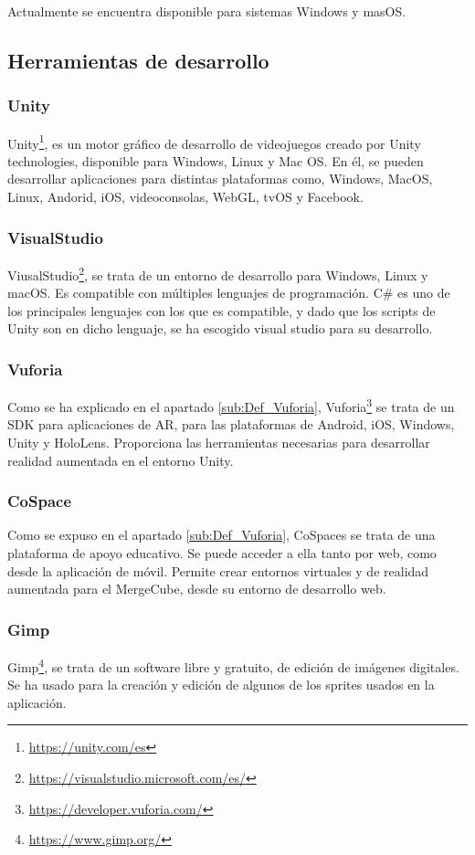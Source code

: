  
 Actualmente se encuentra disponible para sistemas Windows y masOS.

\subsection{Herramientas de desarrollo}

\subsubsection{Unity}
Unity\footnote{\url{https://unity.com/es}}, es un motor gráfico de desarrollo de videojuegos creado por Unity technologies, disponible para Windows, Linux y Mac OS. En él, se pueden desarrollar aplicaciones para distintas plataformas como, Windows, MacOS, Linux, Andorid, iOS, videoconsolas, WebGL, tvOS y Facebook.

\subsubsection{VisualStudio}
ViusalStudio\footnote{\url{https://visualstudio.microsoft.com/es/}}, se trata de un entorno de desarrollo para Windows, Linux y macOS. Es compatible con múltiples lenguajes de programación. C\# es uno de los principales lenguajes con los que es compatible, y dado que los scripts de Unity son en dicho lenguaje, se ha escogido visual studio para su desarrollo.


\subsubsection{Vuforia}
Como se ha explicado en el apartado \ref{sub:Def_Vuforia}, Vuforia\footnote{\url{https://developer.vuforia.com/}} se trata de un SDK para aplicaciones de AR, para las plataformas de Android, iOS, Windows, Unity y HoloLens. Proporciona las herramientas necesarias para desarrollar realidad aumentada en el entorno Unity.

\subsubsection{CoSpace}
Como se expuso en el apartado \ref{sub:Def_Vuforia}, CoSpaces se trata de una plataforma de apoyo educativo. Se puede acceder a ella tanto por web, como desde la aplicación de móvil. Permite crear entornos virtuales y de realidad aumentada para el MergeCube, desde su entorno de desarrollo web.

\subsubsection{Gimp}
Gimp\footnote{\url{https://www.gimp.org/}}, se trata de un software libre y gratuito, de edición de imágenes digitales. Se ha usado para la creación y edición de algunos de los sprites usados en la aplicación.

